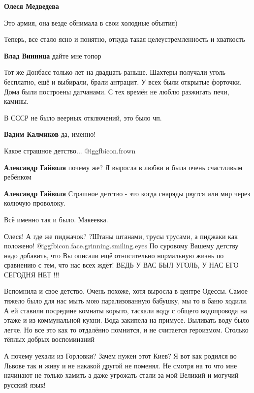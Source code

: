 \begin{itemize}
\textbf{Олеся Медведева}

Это армия, она везде обнимала в свои холодные объятия)


Теперь, все стало ясно и понятно, откуда такая целеустремленность и хваткость

\textbf{Влад Винница} дайте мне топор


Тот же Донбасс только лет на двадцать раньше. Шахтеры получали уголь
бесплатно, ещё и выбирали, брали антрацит. У всех были открытые форточки.
Дома были построены датчанами. С тех времён не люблю разжигать печи, камины.

В СССР не было веерных отключений, это было чп.


\textbf{Вадим Калмиков} да, именно!

Какое страшное детство...  @igg{fbicon.frown} 

\begin{itemize} %
\textbf{Александр Гайволя} почему же? Я выросла в любви и была очень счастливым ребёнком

\textbf{Александр Гайволя}
Страшное детство - это когда снаряды рвутся или мир через колючую проволоку.
\end{itemize} %

Всё именно так и было. Макеевка.


Олеся! А где же пиджачок? ?Штаны штанами, трусы трусами, а пиджаки как положено!
@igg{fbicon.face.grinning.smiling.eyes} По суровому Вашему детству надо
добавить, что Вы описали ещё относительно нормальную жизнь по сравнению с тем,
что нас всех ждёт!  ВЕДЬ У ВАС БЫЛ УГОЛЬ, У НАС ЕГО СЕГОДНЯ НЕТ !!!

Вспомнила и свое детство. Очень похоже, хотя выросла в центре Одессы.
Самое тяжело было для нас мыть мою парализованную бабушку, мы то в баню ходили. А ей ставили посредине комнаты корыто, таскали воду с общего водопровода на этаже и из коммунальной кухни. Вода закипела на примусе.
Выливать воду было легче.
Но все это как то отдалённо помнится, и не считается героизмом.
Столько тёплых добрых воспоминаний


А почему уехали из Горловки? Зачем нужен этот Киев? Я вот как родился во Львове
так и живу и не накакой другой не поменял. Не смотря на то что мне начинают не
только хамить а даже угрожать стали за мой Великий и могучий русский язык!


\end{itemize}
